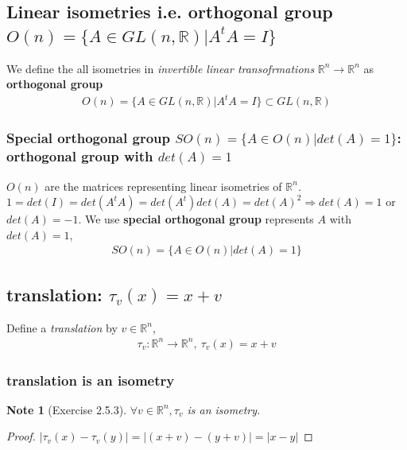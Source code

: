 \documentclass[11pt,a4paper]{article}
\newtheorem{note}{Note}
\begin{document}
\subsection{ Linear isometries i.e. orthogonal group $O(n)=\{A\in GL(n,\mathbb{R})|A^tA=I \}$}
We define the all isometries in \textit{invertible linear transofrmations} $\mathbb{R}^n \rightarrow \mathbb{R}^n$ as \textbf{orthogonal group}
\begin{equation}
    \begin{aligned}
        O(n)=\{A\in GL(n,\mathbb{R})|A^tA=I \}\subset GL(n,\mathbb{R})
    \end{aligned}
    \nonumber
\end{equation}

\subsubsection{Special orthogonal group $SO(n)=\{A\in O(n) | det(A)=1\}$: orthogonal group with $det(A)=1$}
$O(n)$ are the matrices representing linear isometries of $\mathbb{R}^n$.
$1=det(I)=det(A^tA)=det(A^t)det(A)=det(A)^2 \Rightarrow	det(A)=1$ or $det(A)=-1$. We use \textbf{special orthogonal group} represents $A$ with $det(A)=1$,
\begin{equation}
    \begin{aligned}
        SO(n)=\{A\in O(n) | det(A)=1\}
    \end{aligned}
    \nonumber
\end{equation}

\subsection{translation: $\tau_v(x)=x+v$}
Define a \textit{translation} by $v\in \mathbb{R}^n$,
\begin{equation}
    \begin{aligned}
        \tau_v:\mathbb{R}^n \rightarrow \mathbb{R}^n,\ \tau_v(x)=x+v
    \end{aligned}
    \nonumber
\end{equation}
\subsubsection{translation is an isometry}
\begin{note}[Exercise 2.5.3]
$\forall v\in \mathbb{R}^n, \tau_v$ is an isometry.
\end{note}
\begin{proof}
$|\tau_v(x)-\tau_v(y)|=|(x+v)-(y+v)|=|x-y|$
\end{proof}
\end{document}
